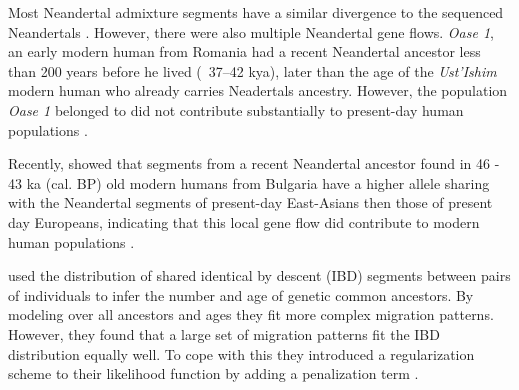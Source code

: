 Most Neandertal admixture segments have a similar divergence to the sequenced Neandertals \citep{browning_analysis_2018}. However, there were also multiple Neandertal gene flows. \textit{Oase 1}, an early modern human from Romania had a recent Neandertal ancestor less than 200 years before he lived (~37–42 kya), later than the age of the \textit{Ust'Ishim} modern human who already carries Neadertals ancestry. However, the population \textit{Oase 1}  belonged to did  not contribute substantially to present-day human populations  \citep{fu_genome_2014,fu_early_2015}.

Recently, \cite{hajdinjak_early_2021} showed that segments from a recent Neandertal ancestor found in  46 - 43 ka (cal. BP) old modern humans from Bulgaria have a higher allele sharing with the Neandertal segments of present-day East-Asians then those of present day Europeans, indicating that this local gene flow did contribute to modern human populations \citep{hajdinjak_early_2021}.  



\cite{ralph_geography_2013} used the distribution of shared identical by descent (IBD)  segments between pairs of individuals to infer the number and age of genetic common ancestors. By modeling over all ancestors and ages they fit more complex migration patterns. However, they found that a large set of migration patterns fit the IBD distribution equally well. To cope with this they introduced a regularization scheme to their likelihood function by adding a penalization term \citep{ralph_geography_2013}.



